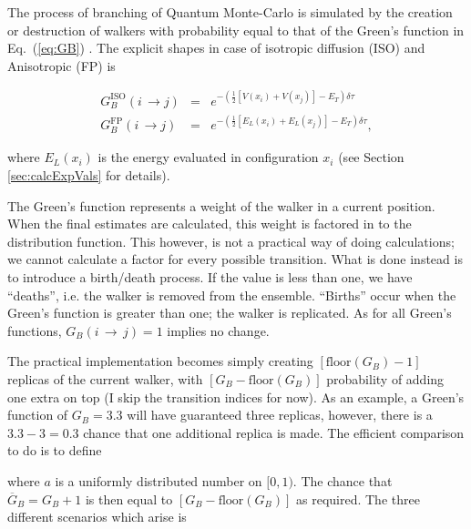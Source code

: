 The process of branching of Quantum Monte-Carlo is simulated by the creation or destruction of walkers with probability equal to that of the Green's function in Eq.~(\ref{eq:GB}) \cite{abInitioMC}. The explicit shapes in case of isotropic diffusion (ISO) and Anisotropic (FP) is

\begin{eqnarray}
 G_B^\mathrm{ISO}(i\,\rightarrow j) &=& e^{-\left(\frac{1}{2}\left[V(x_i) + V(x_j)\right] - E_T\right)\delta\tau}\label{eq:branchISO} \\
 G_B^\mathrm{FP}(i\,\rightarrow j) &=& e^{-\left(\frac{1}{2}\left[E_L(x_i) + E_L(x_j)\right] - E_T\right)\delta\tau}, \label{eq:branchFP}
\end{eqnarray}

where $E_L(x_i)$ is the energy evaluated in configuration $x_i$ (see Section \ref{sec:calcExpVals} for details). 

The Green's function represents a weight of the walker in a current position. When the final estimates are calculated, this weight is factored in to the distribution function. This however, is not a practical way of doing calculations; we cannot calculate a factor for every possible transition. What is done instead is to introduce a birth/death process. If the value is less than one, we have ``deaths'', i.e. the walker is removed from the ensemble. ``Births'' occur when the Green's function is greater than one; the walker is replicated. As for all Green's functions, $G_B(i\,\rightarrow\,j) = 1$ implies no change. 

The practical implementation becomes simply creating $\left[\mathrm{floor}(G_B) - 1\right]$ replicas of the current walker, with $\left[G_B - \mathrm{floor}(G_B)\right]$ probability of adding one extra on top (I skip the transition indices for now). As an example, a Green's function of $G_B=3.3$ will have guaranteed three replicas, however, there is a $3.3-3 = 0.3$ chance that one additional replica is made. The efficient comparison to do is to define 



where $a$ is a uniformly distributed number on $[0,1)$. The chance that $\overline{G}_B = G_B + 1$ is then equal to $\left[G_B - \mathrm{floor}(G_B)\right]$ as required. The three different scenarios which arise is

